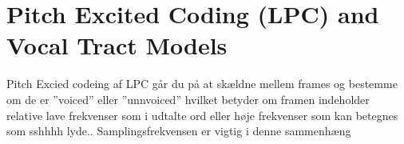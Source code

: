 \chapter{Pitch Excited Coding (LPC) and Vocal Tract Models}
\label{ch:part4}

Pitch Excied codeing af LPC går du på at skældne mellem frames og bestemme om de er ''voiced'' eller ''unnvoiced'' hvilket betyder om framen indeholder relative lave frekvenser som i udtalte ord eller høje frekvenser som kan betegnes som sshhhh lyde..
Samplingsfrekvensen er vigtig i denne sammenhæng  